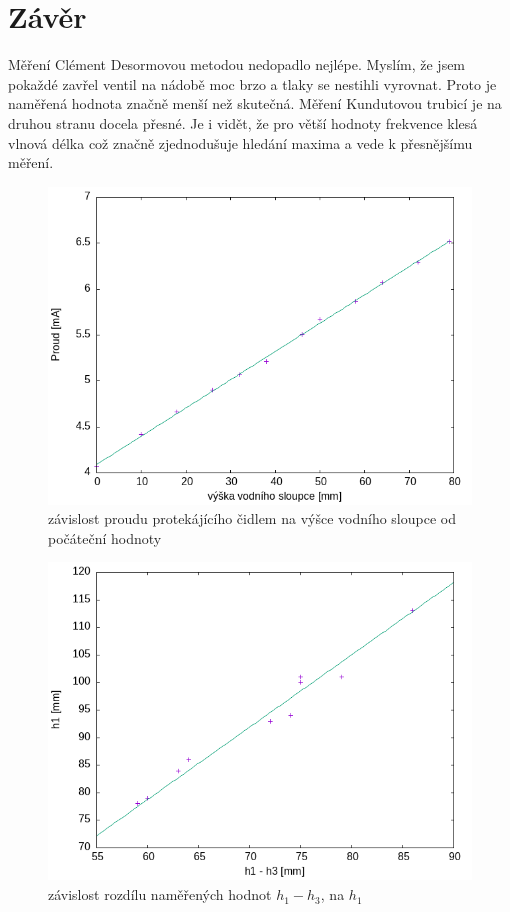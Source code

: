 \documentclass[a4paper,11pt]{article}
\begin{document}
\section{Závěr}

Měření Clément Desormovou metodou nedopadlo nejlépe. Myslím, že jsem pokaždé zavřel ventil na nádobě moc brzo a tlaky se nestihli vyrovnat.
Proto je naměřená hodnota značně menší než skutečná. Měření Kundutovou trubicí je na druhou stranu docela přesné. 
Je i vidět, že pro větší hodnoty frekvence klesá vlnová délka což značně zjednodušuje hledání maxima a vede k přesnějšímu měření.



\begin{figure}[bp!]
  \centering
  \includegraphics[width=0.7\linewidth]{kalibrace_proudu.png}
  \caption{závislost proudu protekájícího čidlem na výšce vodního sloupce od počáteční hodnoty}
  \label{fig:1}
\end{figure}

\begin{figure}[bp!]
  \centering
  \includegraphics[width=0.7\linewidth]{clement.png}
  \caption{závislost rozdílu naměřených hodnot $h_1 - h_3$, na $h_1$}
  \label{fig:2}
\end{figure}
\end{document}
